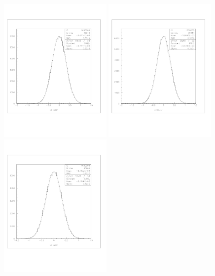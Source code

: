 \documentclass[a4paper]{article}
\begin{document}
\begin{figure}[!htb]
  \centering
  \includegraphics[width=0.49\textwidth]{ex_images/1_100_010_xse.jpg}
  \includegraphics[width=0.49\textwidth]{ex_images/1_100_030_xse.jpg}
  \includegraphics[width=0.49\textwidth]{ex_images/1_100_050_xse.jpg}

\end{figure}
\end{document}
